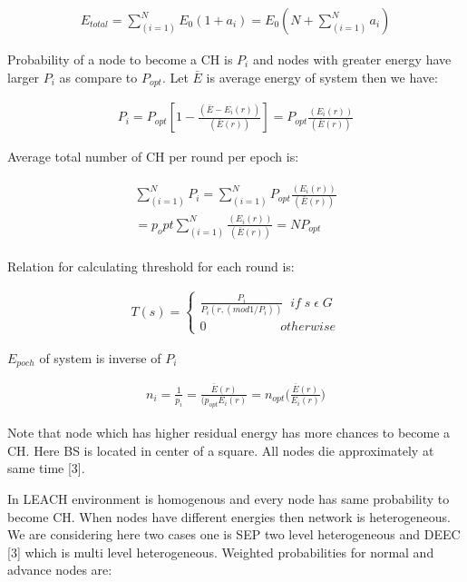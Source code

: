 \documentclass[10pt, conference, compsocconf]{IEEEtran}
\begin{document}
\begin{eqnarray}
E_{total}= \sum_{(i=1)}^{N} E_{0}( 1 +a_i )=   E_{0}(N+\sum_{(i=1)}^{N}a_{i})
\end{eqnarray}

Probability of a node to become a CH is $P_{i}$ and nodes with greater energy have larger $P_{i}$ as compare to $P_{opt}$. Let  $\bar{E}$ is average energy of system then we have:

\begin{eqnarray}
P_i=P_{opt} [1-\frac{(\bar{E}-E_i (r))}{(\bar{E}(r))}]=P_{opt}  \frac{(E_i (r))}{(\bar{E}(r))}
\end{eqnarray}

 Average total number of CH per round per epoch is:

\begin{eqnarray}
\begin{split}
\sum_{(i=1)}^{N}P_{i}=\sum_{(i=1)}^{N} P_{opt}  \frac{(E_i (r))}{(\bar{E}(r))} \\ =p_opt \sum_{(i=1)}^{N}\frac{(E_i (r))}{(\bar{E}(r))}=N P_{opt }
\end{split}
\end{eqnarray}

Relation for calculating threshold for each round is:

\begin{eqnarray}
T (s)=
\begin{cases}\frac{P_i}{P_i(r, (mod1/P_i))}  \;\; if \; s \; \epsilon  \;G \\
0                   \;\;\;\;\;\;\; \;\;\;\;\;\;\; \;\;\;\;\;\;\;otherwise
\end{cases}
\end{eqnarray}

$E_{poch}$ of system is inverse of $P_i$

\begin{eqnarray}
n_i=\frac{1}{p_i} =\frac{\bar{E} (r)}{(p_{opt} E_i (r)}= n_{opt} \Big( \frac{\bar{E}(r)}{E_i (r)} \Big)
\end{eqnarray}

Note that node which has higher residual energy has more chances to become a CH. Here BS is located in center of a square. All nodes die approximately at same time [3].

In LEACH environment is homogenous and every node has same probability to become CH. When nodes have different energies then network is heterogeneous. We are considering here two cases one is SEP two level heterogeneous and DEEC [3] which is multi level heterogeneous. Weighted probabilities for normal and advance nodes are:
\end{document}

